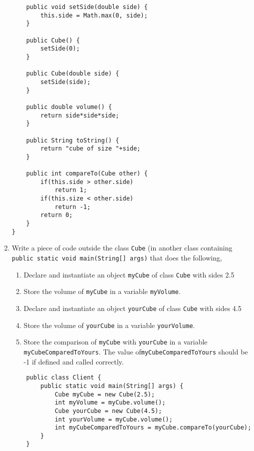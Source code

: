 \begin{questions}
\begin{enumerate}
\begin{solution}
\begin{lstlisting}
	public void setSide(double side) {
		this.side = Math.max(0, side);
	}
	
	public Cube() {
		setSide(0);
	}
	
	public Cube(double side) {
		setSide(side);
	}
	
	public double volume() {
		return side*side*side;
	}
	
	public String toString() {
		return "cube of size "+side;
	}
	
	public int compareTo(Cube other) {
		if(this.side > other.side)
			return 1;
		if(this.size < other.side)
			return -1;
		return 0;
	}
}
\end{lstlisting}
\end{solution}

\ifprintanswers
\else
\newpage
\fi

\item Write a piece of code outside the class \texttt{Cube} (in another class containing \texttt{public static void main(String[] args)} that does the following,

	\begin{enumerate}
		\item Declare and instantiate an object \texttt{myCube} of class \texttt{Cube} with sides 2.5
		\item Store the volume of \texttt{myCube} in a variable \texttt{myVolume}.
		\item Declare and instantiate an object \texttt{yourCube} of class \texttt{Cube} with sides 4.5
		\item Store the volume of \texttt{yourCube} in a variable \texttt{yourVolume}.
		\item Store the comparison of \texttt{myCube} with \texttt{yourCube} in a variable \texttt{myCubeComparedToYours}. The value of\texttt{myCubeComparedToYours} should be -1 if defined and called correctly.
	\end{enumerate}
	
	\begin{solution}
	\begin{lstlisting}
	public class Client {
		public static void main(String[] args) {
			Cube myCube = new Cube(2.5);
			int myVolume = myCube.volume();
			Cube yourCube = new Cube(4.5);
			int yourVolume = myCube.volume();
			int myCubeComparedToYours = myCube.compareTo(yourCube);
		}
	}
	\end{lstlisting}
	
	\end{solution}

\end{enumerate}


\end{questions}
